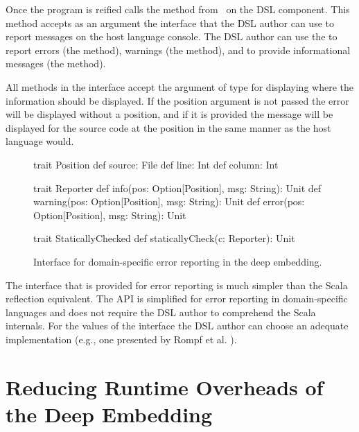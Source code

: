 Once the program is reified \yy calls the  method from~ on the DSL component. This method accepts as an argument the  interface that the  DSL
author can use to report messages on the host language console. The DSL author can use
the  to report errors (the  method), warnings (the  method),
and to provide informational messages (the  method).


All methods in the  interface accept the  argument of type 
 for displaying where the information should be displayed. If the position argument
 is not passed the error will be displayed without a position, and if it is provided the
 message will be displayed for the source code at the position in the same manner
 as the host language would.

\begin{figure}
\begin{listingtiny}
trait Position {
  def source: File
  def line: Int
  def column: Int
}

trait Reporter {
  def info(pos: Option[Position], msg: String): Unit
  def warning(pos: Option[Position], msg: String): Unit
  def error(pos: Option[Position], msg: String): Unit
}

trait StaticallyChecked {
  def staticallyCheck(c: Reporter): Unit
}
\end{listingtiny}
\caption{Interface for domain-specific error reporting in the deep embedding.}
\label{fig:statically-checked}
\end{figure}

The interface that is provided for error reporting is much simpler than the Scala reflection equivalent. The API
is simplified for error reporting in domain-specific languages and does not require the
DSL author to comprehend the Scala internals. For the values of the  interface
the DSL author can choose an adequate implementation (e.g., one presented by Rompf et al. \cite{rompf_scala-virtualized:_2009}).




\chapter{Reducing Runtime Overheads of the Deep Embedding}
\label{sec:reducing-runtime-overheads}





